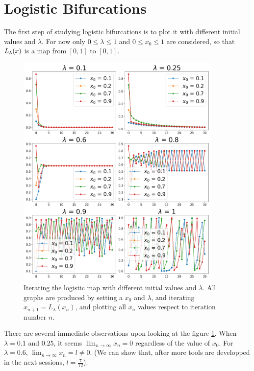 \section{Logistic Bifurcations}

The first step of studying logistic bifurcations is to plot it with different initial values and $\lambda$. 
For now only $0 \leq \lambda \leq 1$ and $0 \leq x_0 \leq 1$ are considered, so that $L_{\lambda}(x)$ is a map from $[0,1]$ to $[0,1]$. 

\begin{figure}[htbp]
	\centering
	\includegraphics[width=0.9\textwidth]{./figures/various_iterating_logistic_map.png}
	\caption{Iterating the logistic map with different initial values and $\lambda$. All graphs are produced by setting a $x_0$ and $\lambda$, and iterating $x_{n+1} = L_{\lambda}(x_n)$, and plotting all $x_n$ values respect to iteration number $n$.}
	\label{fig:various_iter_logistic}
\end{figure}

There are several immediate observations upon looking at the figure \ref{fig:various_iter_logistic}.
When $\lambda = 0.1$ and $0.25$, it seems $\lim_{n \rightarrow \infty} x_n = 0$ regardless of the value of $x_0$.
For $\lambda = 0.6$, $\lim_{n \rightarrow \infty} x_n = l \neq 0$. 
(We can show that, after more tools are developped in the next sessions, $l = \frac{7}{12}$). 

